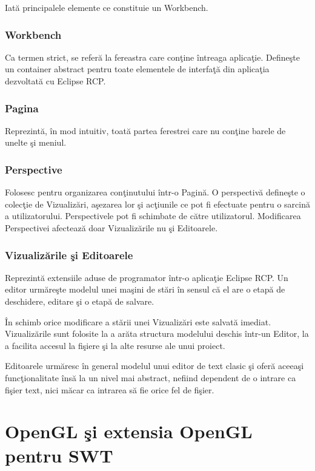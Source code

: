 Iată principalele elemente ce constituie un Workbench.

\subsubsection{Workbench}
Ca termen strict, se referă la fereastra care conţine întreaga aplicaţie. 
Defineşte un container abstract pentru toate elementele de interfaţă din 
aplicaţia dezvoltată cu Eclipse RCP.

\subsubsection{Pagina}
Reprezintă, în mod intuitiv,  toată partea ferestrei care nu conţine barele de 
unelte şi meniul.

\subsubsection{Perspective}
Folosesc pentru organizarea conţinutului într-o Pagină. O perspectivă defineşte 
o colecţie de Vizualizări, aşezarea lor şi acţiunile ce pot fi efectuate pentru 
o sarcină a utilizatorului. Perspectivele pot fi schimbate de către 
utilizatorul. Modificarea Perspectivei afectează doar Vizualizările nu şi 
Editoarele. \cite{eclipsehelp}

\subsubsection{Vizualizările şi Editoarele}
Reprezintă extensiile aduse de programator într-o aplicaţie Eclipse RCP. Un 
editor urmăreşte modelul unei maşini de stări în sensul că el are o etapă de 
deschidere, editare şi o etapă de salvare.

În schimb orice modificare a stării unei Vizualizări este salvată imediat. 
Vizualizările sunt folosite la a arăta structura modelului deschis într-un 
Editor, la a facilita accesul la fişiere şi la alte resurse ale unui proiect.

Editoarele urmăresc în general modelul unui editor de text clasic şi oferă 
aceeaşi funcţionalitate însă la un nivel mai abstract, nefiind dependent de o 
intrare ca fişier text, nici măcar ca intrarea să fie orice fel de fişier.

\section{OpenGL şi extensia OpenGL pentru SWT}

